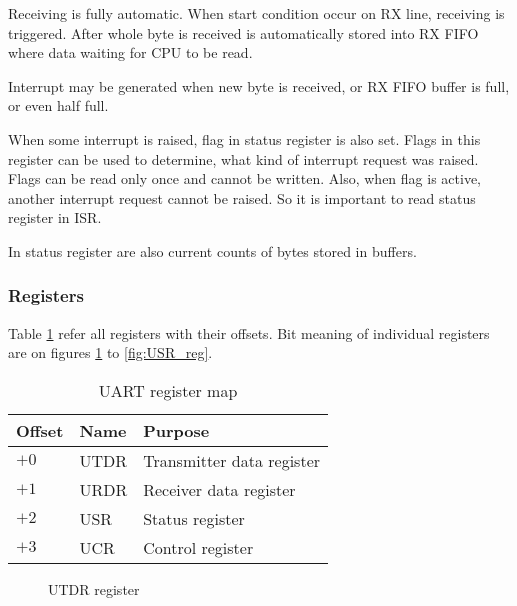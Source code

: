 Receiving is fully automatic. When start condition occur on RX line, receiving is
triggered. After whole byte is received is automatically stored into RX FIFO where
data waiting for CPU to be read.

Interrupt may be generated when new byte is received, or RX FIFO buffer is full, or even
half full.

When some interrupt is raised, flag in status register is also set. Flags in this
register can be used to determine, what kind of interrupt request was raised. Flags
can be read only once and cannot be written. Also, when flag is active, another interrupt
request cannot be raised. So it is important to read status register in ISR.

In status register are also current counts of bytes stored in buffers.

\subsubsection{Registers}
\label{sec:peripherals_uart_reg}

Table \ref{tab:uart_reg_map} refer all registers with their offsets. Bit meaning
of individual registers are on figures \ref{fig:UTDR_reg} to \ref{fig:USR_reg}.

\begin{table}[H]
    \centering
    \begin{tabular}{|l|l|l|}
        \hline
        \textbf{Offset} & \textbf{Name} & \textbf{Purpose}           \\ \hline
        $+0$            & UTDR          & Transmitter data register  \\ \hline
        $+1$            & URDR          & Receiver data register     \\ \hline
        $+2$            & USR           & Status register            \\ \hline
        $+3$            & UCR           & Control register           \\ \hline
    \end{tabular}
    \caption{UART register map}
    \label{tab:uart_reg_map}
\end{table}

\begin{figure}[H]
    \centering
    \caption{UTDR register}
    \label{fig:UTDR_reg}
\end{figure}

